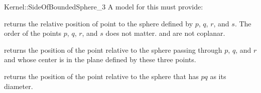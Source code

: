 \begin{ccRefFunctionObjectConcept}{Kernel::SideOfBoundedSphere_3}
A model for this must provide:


         {returns the relative position of point 
          to the sphere defined by $p$, $q$, $r$, and $s$. The order
          of the points $p$, $q$, $r$, and $s$ does not matter.
          \ccPrecond {} and  are not coplanar.}

   {returns the position of the point  relative to the sphere
    passing through $p$, $q$, and $r$ and whose center is in the plane defined
    by these three points.}

         {returns the position of the point  relative to the sphere
          that has $pq$ as its diameter.}

\ccSeeAlso
{} \\


\end{ccRefFunctionObjectConcept}
